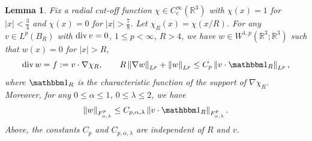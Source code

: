 \documentclass[11pt]{article}
\numberwithin{equation}{section}
\newtheorem{lem}[thm]{Lemma}
\theoremstyle{remark}
\theoremstyle{definition}
\newcommand{\norm}[1]{\left \| #1 \right \|}
\newcommand{\R}{\mathbb{R}}
\renewcommand{\div}{\mathop{\rm div}\nolimits}
\newcommand{\nb}{\nabla}
\newcommand\al{\alpha}
\newcommand\la{\lambda}
\newcommand{\EQ}[1]{\begin{equation} #1 \end{equation}}
\begin{document}
\begin{lem}\label{2.4} Fix a radial cut-off function $\chi \in C^\infty_c(\R^3)$ with $\chi(x)=1$ for $|x|<\frac 34$ and $\chi(x)=0$ for $|x|>\frac 78$. Let $\chi_R(x)=\chi(x/R)$.
For any $v \in L^p(B_R)$ with $\div v=0$, $1\le p<\infty$, $R>4$,
we have $w\in W^{1,p}(\R^3;\R^3)$ such that $w(x)=0$ for $|x|>R$,
\EQ{\label{wR.eq1}
\div w= f:= v \cdot \nb \chi_R, \qquad
R\norm{\nb w}_{L^p} +\norm{ w}_{L^p} \le C_p \norm{v\cdot \mathbbm 1_{R}}_{L^p},
}
where $\mathbbm 1_{R}$ is the characteristic function of the support of $\nb\chi_R$.
Moreover, for any $0 \le \al \le 1$, $0 \le \la \le 2$, we have
\EQ{\label{wR.eq2}
\norm{w}_{F^p_{\al,\la}} \le C_{p,\al,\la} \norm{v\cdot \mathbbm 1_{R}}_{F^p_{\al,\la}} .
}
Above, the constants $C_p$ and $C_{p,\al,\la}$ are independent of $R$ and $v$.
\end{lem}
\end{document}
